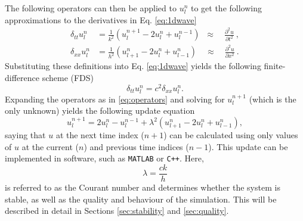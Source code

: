 The following operators can then be applied to $u_l^n$ to get the following approximations to the derivatives in Eq. \eqref{eq:1dwave}
\begin{subequations}\label{eq:operators}
    \begin{align}
         \delta_{tt}u_l^n &= \frac{1}{k^2}\left(u_l^{n+1}-2u_l^n + u_l^{n-1}\right)\;\;\approx\quad\frac{\partial^2u}{\partial t^2}\label{eq:secondOrderTime}\ ,\\
         \delta_{xx}u_l^n &= \frac{1}{h^2}\left(u_{l+1}^n-2u_l^n + u_{l-1}^n\right)\quad\approx\quad \frac{\partial^2u}{\partial x^2}\ .\label{eq:secondOrderSpace}
    \end{align}
\end{subequations}
Substituting these definitions into Eq. \eqref{eq:1dwave} yields the following finite-difference scheme (FDS)
\begin{equation}\label{eq:FDS}
    \delta_{tt}u_l^n = c^2 \delta_{xx}u_l^n.
\end{equation}
Expanding the operators as in %
\eqref{eq:operators} and solving for $u_l^{n+1}$ (which is the only unknown) yields the following update equation
\begin{equation}\label{eq:updateEq}
    u_l^{n+1} = 2u_l^n-u_l^{n-1} + \lambda^2 \left(u_{l+1}^n-2u_l^n + u_{l-1}^n\right),
\end{equation}
saying that $u$ at the next time index ($n+1$) can be calculated using only values of $u$ at the current ($n$) and previous time indices ($n-1$). This update can be implemented in software, such as {\tt MATLAB} or {\tt C++}. Here,
\begin{equation}\label{eq:lambdaDef}
    \lambda = \frac{ck}{h}
\end{equation}
is referred to as the Courant number and determines whether the system is stable, as well as the quality and behaviour of the simulation. This will be described in detail in Sections \ref{sec:stability} and \ref{sec:quality}.


